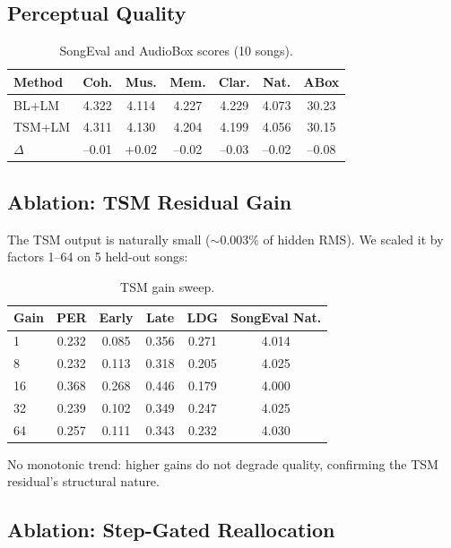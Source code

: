 \documentclass[11pt,a4paper]{article}
\begin{document}
\subsection{Perceptual Quality}

\begin{table}[h]
\centering
\caption{SongEval and AudioBox scores (10 songs).}
\label{tab:perceptual}
\begin{tabular}{lcccccc}
\toprule
Method & Coh. & Mus. & Mem. & Clar. & Nat. & ABox \\
\midrule
BL+LM & 4.322 & 4.114 & 4.227 & 4.229 & 4.073 & 30.23 \\
TSM+LM & 4.311 & 4.130 & 4.204 & 4.199 & 4.056 & 30.15 \\
$\Delta$ & --0.01 & +0.02 & --0.02 & --0.03 & --0.02 & --0.08 \\
\bottomrule
\end{tabular}
\end{table}

\subsection{Ablation: TSM Residual Gain}

The TSM output is naturally small ($\sim$0.003\% of hidden RMS). We scaled it by factors 1--64 on 5 held-out songs:

\begin{table}[h]
\centering
\caption{TSM gain sweep.}
\label{tab:gain}
\begin{tabular}{lccccc}
\toprule
Gain & PER & Early & Late & LDG & SongEval Nat.\\
\midrule
1 & 0.232 & 0.085 & 0.356 & 0.271 & 4.014 \\
8 & 0.232 & 0.113 & 0.318 & 0.205 & 4.025 \\
16 & 0.368 & 0.268 & 0.446 & 0.179 & 4.000 \\
32 & 0.239 & 0.102 & 0.349 & 0.247 & 4.025 \\
64 & 0.257 & 0.111 & 0.343 & 0.232 & 4.030 \\
\bottomrule
\end{tabular}
\end{table}

No monotonic trend: higher gains do not degrade quality, confirming the TSM residual's structural nature.

\subsection{Ablation: Step-Gated Reallocation}
\end{document}

